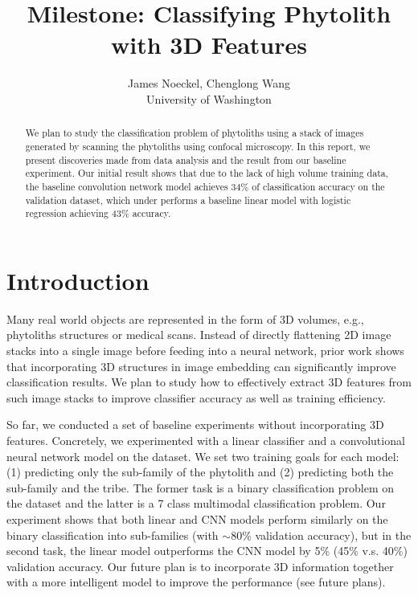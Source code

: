\documentclass{article}
\title{Milestone: Classifying Phytolith with 3D Features}
\author{
  James Noeckel, Chenglong Wang\\
  University of Washington
}
\begin{document}

\maketitle

\begin{abstract}
  We plan to study the classification problem of phytoliths using a stack of images generated by scanning the phytoliths using confocal microscopy. In this report, we present discoveries made from data analysis and the result from our baseline experiment. Our initial result shows that due to the lack of high volume training data, the baseline convolution network model achieves 34\% of classification accuracy on the validation dataset, which under performs a baseline linear model with logistic regression achieving 43\% accuracy.
\end{abstract}

\section{Introduction}

Many real world objects are represented in the form of 3D volumes, e.g., phytoliths structures or medical scans. Instead of directly flattening 2D image stacks into a single image before feeding into a neural network, prior work shows that incorporating 3D structures in image embedding can significantly improve classification results. We plan to study how to effectively extract 3D features from such image stacks to improve classifier accuracy as well as training efficiency.

So far, we conducted a set of baseline experiments without incorporating 3D features. Concretely, we experimented with a linear classifier and a convolutional neural network model on the dataset. We set two training goals for each model: (1) predicting only the sub-family of the phytolith and (2) predicting both the sub-family and the tribe. The former task is a binary classification problem on the dataset and the latter is a 7 class multimodal classification problem. Our experiment shows that both linear and CNN models perform similarly on the binary classification into sub-families (with $\sim$80\% validation accuracy), but in the second task, the linear model outperforms the CNN model by 5\% (45\% v.s. 40\%) validation accuracy. Our future plan is to incorporate 3D information together with a more intelligent model to improve the performance (see future plans).
\end{document}
